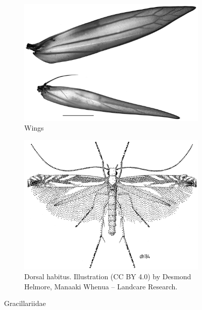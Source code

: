 \documentclass[letterpaper, 11pt]{article}
\begin{document}
\begin{figure}[ht!]
    \centering
    \begin{subfigure}[ht!]{0.41\textwidth}
        \includegraphics[width=\textwidth]{GracillariidWings}
        \caption{Wings \cite[][Fig. 11, CC BY 4.0]{BaiGracillariid}}
        \label{fig:gracilWings}
    \end{subfigure}
    \hfill %
    \begin{subfigure}[ht!]{0.45\textwidth}
        \includegraphics[width=\textwidth]{gracillHab.png}
        \caption{Dorsal habitus. Illustration (CC BY 4.0) by Desmond Helmore, Manaaki Whenua – Landcare Research.}
        \label{fig:gracill2}
    \end{subfigure}
    \caption{Gracillariidae}\label{fig:gracillariids}
\end{figure}
\end{document}
